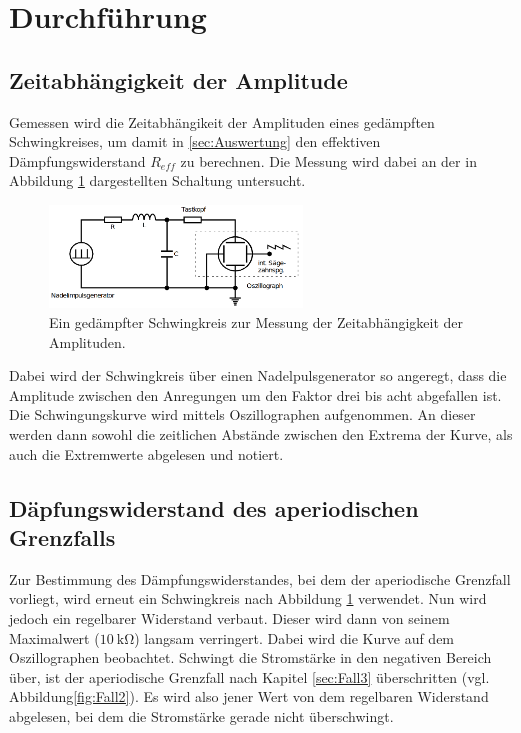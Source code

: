 \section{Durchführung}
\label{sec:Durchführung}
\subsection{Zeitabhängigkeit der Amplitude}
\label{sec:a}
Gemessen wird die Zeitabhängikeit der Amplituden eines gedämpften Schwingkreises, um damit in \ref{sec:Auswertung} den effektiven Dämpfungswiderstand
$R_{eff}$ zu berechnen. Die Messung wird dabei an der in Abbildung \ref{fig:a} dargestellten Schaltung untersucht. 
\begin{figure}[H]
    \centering
    \includegraphics[width=0.6\textwidth]{pictures/Aufbau_a.png}
    \caption{Ein gedämpfter Schwingkreis zur Messung der Zeitabhängigkeit der Amplituden.\cite{AP01}}
    \label{fig:a}
\end{figure}
Dabei wird der Schwingkreis über einen Nadelpulsgenerator so angeregt, dass die Amplitude zwischen den Anregungen um den Faktor drei bis acht 
abgefallen ist. Die Schwingungskurve wird mittels Oszillographen aufgenommen. An dieser werden dann sowohl die zeitlichen Abstände zwischen den Extrema 
der Kurve, als auch die Extremwerte abgelesen und notiert.

\subsection{Däpfungswiderstand des aperiodischen Grenzfalls}
\label{sec:b}
Zur Bestimmung des Dämpfungswiderstandes, bei dem der aperiodische Grenzfall vorliegt, wird erneut ein Schwingkreis nach Abbildung \ref{fig:a}
verwendet. Nun wird jedoch ein regelbarer Widerstand verbaut. Dieser wird dann von seinem Maximalwert ($\SI{10}{\kilo\ohm}$) langsam verringert. 
Dabei wird die Kurve auf dem Oszillographen beobachtet. Schwingt die Stromstärke in den negativen Bereich über, ist der aperiodische Grenzfall 
nach Kapitel \ref{sec:Fall3} überschritten (vgl. Abbildung\ref{fig:Fall2}). Es wird also jener Wert von dem regelbaren Widerstand abgelesen, bei 
dem die Stromstärke gerade nicht überschwingt. 

